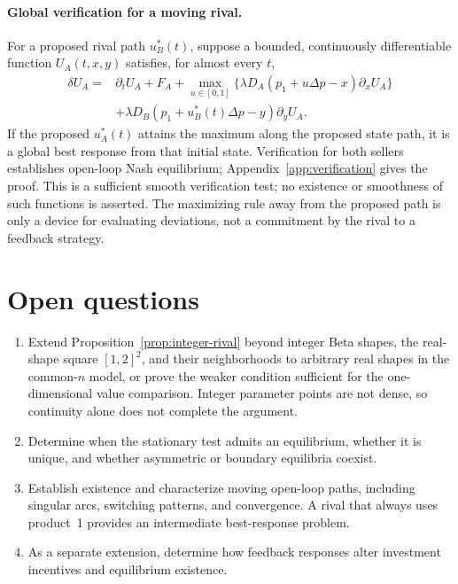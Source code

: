 \documentclass[11pt]{article}
\theoremstyle{definition}
\begin{document}
\paragraph{Global verification for a moving rival.}
For a proposed rival path $u_B^*(t)$, suppose a bounded, continuously
differentiable function $U_A(t,x,y)$ satisfies, for almost every $t$,
\begin{equation}\label{eq:open-loop-verification}
\begin{aligned}
\delta U_A={}&\partial_tU_A+F_A
 +\max_{u\in[0,1]}\{\lambda D_A(p_1+u\Delta p-x)\partial_xU_A\}\\
&+\lambda D_B(p_1+u_B^*(t)\Delta p-y)\partial_yU_A.
\end{aligned}
\end{equation}
If the proposed $u_A^*(t)$ attains the maximum along the proposed state
path, it is a global best response from that initial state. Verification
for both sellers establishes open-loop Nash equilibrium;
Appendix~\ref{app:verification} gives the proof.
This is a sufficient smooth verification test; no existence or smoothness
of such functions is asserted. The maximizing rule away from the proposed
path is only a device for evaluating deviations, not a commitment by the
rival to a feedback strategy.

\section{Open questions}

\begin{enumerate}
\item Extend Proposition~\ref{prop:integer-rival} beyond integer Beta shapes,
the real-shape square $[1,2]^2$, and their neighborhoods to arbitrary real
shapes in the common-$n$ model,
or prove the weaker condition sufficient for the one-dimensional value
comparison. Integer parameter points are not dense, so continuity alone
does not complete the argument.
\item Determine when the stationary test admits an equilibrium, whether
it is unique, and whether asymmetric or boundary equilibria coexist.
\item Establish existence and characterize moving open-loop paths,
including singular arcs, switching patterns, and convergence. A rival
that always uses product~1 provides an intermediate best-response problem.
\item As a separate extension, determine how feedback responses alter
investment incentives and equilibrium existence.
\end{enumerate}
\end{document}
